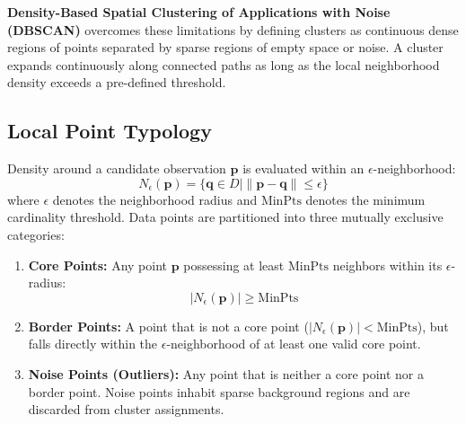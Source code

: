 \textbf{Density-Based Spatial Clustering of Applications with Noise (DBSCAN)} overcomes these limitations by defining clusters as continuous dense regions of points separated by sparse regions of empty space or noise. A cluster expands continuously along connected paths as long as the local neighborhood density exceeds a pre-defined threshold.

\subsection{Local Point Typology}
Density around a candidate observation $\mathbf{p}$ is evaluated within an $\epsilon$-neighborhood:
\begin{equation}
    N_\epsilon(\mathbf{p}) = \{\mathbf{q} \in D \mid \|\mathbf{p} - \mathbf{q}\| \le \epsilon\}
\end{equation}
where $\epsilon$ denotes the neighborhood radius and $\text{MinPts}$ denotes the minimum cardinality threshold. Data points are partitioned into three mutually exclusive categories:
\begin{enumerate}
    \item \textbf{Core Points:} Any point $\mathbf{p}$ possessing at least $\text{MinPts}$ neighbors within its $\epsilon$-radius:
    \begin{equation}
        |N_\epsilon(\mathbf{p})| \ge \text{MinPts}
    \end{equation}
    \item \textbf{Border Points:} A point that is not a core point ($|N_\epsilon(\mathbf{p})| < \text{MinPts}$), but falls directly within the $\epsilon$-neighborhood of at least one valid core point.
    \item \textbf{Noise Points (Outliers):} Any point that is neither a core point nor a border point. Noise points inhabit sparse background regions and are discarded from cluster assignments.
\end{enumerate}

